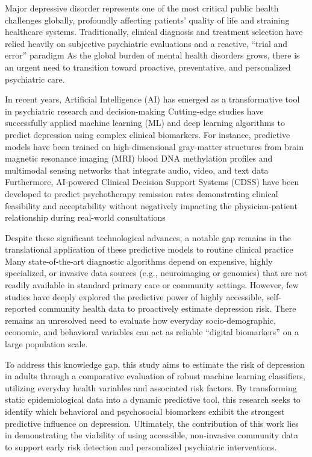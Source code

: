 \documentclass[conference]{IEEEtran}
\begin{document}
Major depressive disorder represents one of the most critical public health challenges globally, profoundly affecting patients' quality of life and straining healthcare systems. Traditionally, clinical diagnosis and treatment selection have relied heavily on subjective psychiatric evaluations and a reactive, ``trial and error'' paradigm \cite{sokolov_decoding_2024, popescu_evaluating_2021}%
As the global burden of mental health disorders grows, there is an urgent need to transition toward proactive, preventative, and personalized psychiatric care.

In recent years, Artificial Intelligence (AI) has emerged as a transformative tool in psychiatric research and decision-making \cite{chiang_systematic_2025}%
Cutting-edge studies have successfully applied machine learning (ML) and deep learning algorithms to predict depression using complex clinical biomarkers. For instance, predictive models have been trained on high-dimensional gray-matter structures from brain magnetic resonance imaging (MRI) \cite{jiang_applying_2026}%
blood DNA methylation profiles \cite{sokolov_decoding_2024}%
and multimodal sensing networks that integrate audio, video, and text data \cite{zhang_multimodal_2024}%
Furthermore, AI-powered Clinical Decision Support Systems (CDSS) have been developed to predict psychotherapy remission rates \cite{kannampallil_cross-trial_2022}%
demonstrating clinical feasibility and acceptability without negatively impacting the physician-patient relationship during real-world consultations \cite{popescu_evaluating_2021, tanguay-sela_evaluating_2022}%

Despite these significant technological advances, a notable gap remains in the translational application of these predictive models to routine clinical practice \cite{chiang_systematic_2025}%
Many state-of-the-art diagnostic algorithms depend on expensive, highly specialized, or invasive data sources (e.g., neuroimaging or genomics) that are not readily available in standard primary care or community settings. However, few studies have deeply explored the predictive power of highly accessible, self-reported community health data to proactively estimate depression risk. There remains an unresolved need to evaluate how everyday socio-demographic, economic, and behavioral variables can act as reliable ``digital biomarkers'' on a large population scale.

To address this knowledge gap, this study aims to estimate the risk of depression in adults through a comparative evaluation of robust machine learning classifiers, utilizing everyday health variables and associated risk factors. By transforming static epidemiological data into a dynamic predictive tool, this research seeks to identify which behavioral and psychosocial biomarkers exhibit the strongest predictive influence on depression. Ultimately, the contribution of this work lies in demonstrating the viability of using accessible, non-invasive community data to support early risk detection and personalized psychiatric interventions.
\end{document}
